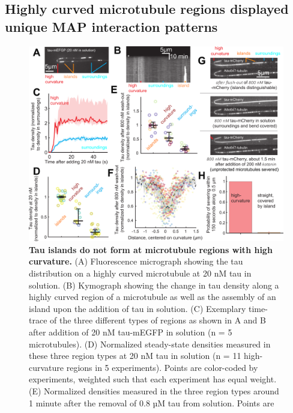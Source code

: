 \subsection{Highly curved microtubule regions displayed unique MAP interaction patterns}
\begin{figure}[h!]
\centering
\includegraphics[width=1\linewidth]{Figures/taucurve.png}
\caption[Tau islands do not form at microtubule regions with high curvature.]{
\textbf{Tau islands do not form at microtubule regions with high curvature.} (A) Fluorescence micrograph showing the tau distribution on a highly curved microtubule at 20 nM tau in solution. (B) Kymograph showing the change in tau density along a highly curved region of a microtubule as well as the assembly of an island upon the addition of tau in solution. (C) Exemplary time-trace of the three different types of regions as shown in A and B after addition of 20 nM tau-mEGFP in solution (n = 5 microtubules). (D) Normalized steady-state densities measured in these three region types at 20 nM tau in solution (n = 11 high-curvature regions in 5 experiments). Points are color-coded by experiments, weighted such that each experiment has equal weight. (E) Normalized densities measured in the three region types around 1 minute after the removal of 0.8 µM tau from solution. Points are
}
\end{figure}
